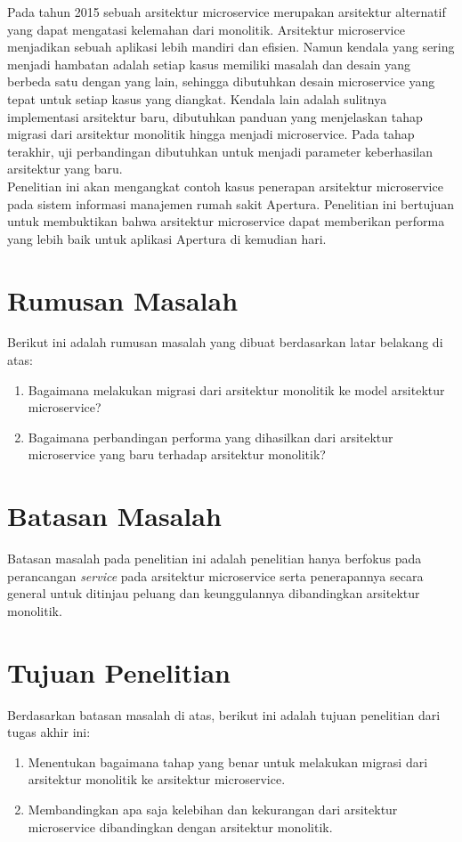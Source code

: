 Pada tahun 2015 sebuah arsitektur microservice merupakan arsitektur alternatif yang dapat mengatasi kelemahan dari monolitik. Arsitektur microservice menjadikan sebuah aplikasi lebih mandiri dan efisien. Namun kendala yang sering menjadi hambatan adalah setiap kasus memiliki masalah dan desain yang berbeda satu dengan yang lain, sehingga dibutuhkan desain microservice yang tepat untuk setiap kasus yang diangkat. Kendala lain adalah sulitnya implementasi arsitektur baru, dibutuhkan panduan yang menjelaskan tahap migrasi dari arsitektur monolitik hingga menjadi microservice. Pada tahap terakhir, uji perbandingan dibutuhkan untuk menjadi parameter keberhasilan arsitektur yang baru.\\
Penelitian ini akan mengangkat contoh kasus penerapan arsitektur microservice pada sistem informasi manajemen rumah sakit Apertura. Penelitian ini bertujuan untuk membuktikan bahwa arsitektur microservice dapat memberikan performa yang lebih baik untuk aplikasi Apertura di kemudian hari.
\section{Rumusan Masalah}
Berikut ini adalah rumusan masalah yang dibuat berdasarkan latar belakang di atas:
\begin {enumerate}[nolistsep, leftmargin=0.5cm]
\item Bagaimana melakukan migrasi dari arsitektur monolitik ke model arsitektur microservice?
\item Bagaimana perbandingan performa yang dihasilkan dari arsitektur microservice yang baru terhadap arsitektur monolitik?
\end{enumerate}

\section{Batasan Masalah}
Batasan masalah pada penelitian ini adalah penelitian hanya berfokus pada perancangan \textit{service} pada arsitektur microservice serta penerapannya secara general untuk ditinjau peluang dan keunggulannya dibandingkan arsitektur monolitik.

\section{Tujuan Penelitian}
Berdasarkan batasan masalah di atas, berikut ini adalah tujuan penelitian dari tugas akhir ini:
\begin{enumerate}[nolistsep,leftmargin=0.5cm]
\item Menentukan bagaimana tahap yang benar untuk melakukan migrasi dari arsitektur monolitik ke arsitektur microservice.
\item Membandingkan apa saja kelebihan dan kekurangan dari arsitektur microservice dibandingkan dengan arsitektur monolitik.
\end{enumerate}

